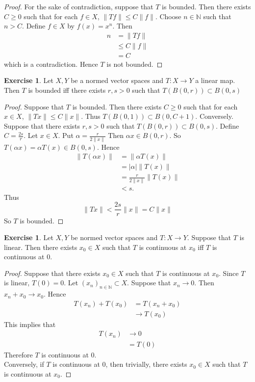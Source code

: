\documentclass[12pt]{amsart}
\theoremstyle{definition}
\newtheorem{ex}[definition]{Exercise}
\newcommand{\al}{\alpha}
\newcommand{\N}{\mathbb{N}}
\DeclareMathOperator*{\0}{\mbf{0}}
\DeclareMathOperator*{\1}{\mbf{1}}
\newcommand{\lex}[1]{\label{ex:#1}}
\begin{document}
	\begin{proof}
	For the sake of contradiction, suppose that $T$ is bounded. Then there exists $C \geq 0$ such that for each $f \in X$, $\|Tf\| \leq C \|f\|$. Choose $n \in \N$ such that $n > C$. Define $f \in X$ by $f(x) = x^n$. Then
	\begin{align*}
	n
	&= \|Tf\| \\
	&\leq C \|f\| \\
	&= C
\end{align*}		
	which is a contradiction. Hence $T$ is not bounded.
	\end{proof}
	
	\begin{ex} \lex{42003}
		Let $X,Y$ be a normed vector spaces and $T:X \rightarrow Y$ a linear map. Then $T$ is bounded iff there exists $r,s>0$ such that $T(B(0,r)) \subset B(0,s)$
	\end{ex}
	
	\begin{proof}
		Suppose that $T$ is bounded. Then there exists $C \geq 0$ such that for each $x \in X$, $\|Tx \|\leq C \|x \|$. Thus $T(B(0,1)) \subset B(0,C+1)$. Conversely. Suppose that there exists $r,s >0$ such that $T(B(0,r)) \subset B(0,s)$. Define $C = \frac{2s}{r}$. Let $x \in X$. Put $\al = \frac{r}{2\|x \|}$ Then $\al x \in B(0,r)$. So $T(\al x ) = \al T(x) \in B(0,s)$. Hence 
		\begin{align*}
			\|T(\al x) \|
			&= \|\al T(x) \|\\
			&= \vert \al \vert \|T(x) \|\\
			& = \frac{r}{2 \|x \|}  \|T(x) \|\\
			& < s.
		\end{align*}
		Thus $$\|Tx \|< \frac{2 s}{r} \|x \|= C \|x \|$$ So $T$ is bounded. 
	\end{proof}
	
	\begin{ex} \lex{42003.1}
	Let $X, Y$ be normed vector spaces and $T:X \rightarrow Y$. Suppose that $T$ is linear. Then there exists $x_0 \in X$ such that $T$ is continuous at $x_0$ iff $T$ is continuous at 0.
	\end{ex}
	
	\begin{proof}
	Suppose that there exists $x_0 \in X$ such that $T$ is continuous at $x_0$. Since $T$ is linear, $T(0) = 0$. Let $(x_n)_{n \in \N} \subset X$. Suppose that $x_n \rightarrow 0$. Then $x_n + x_0 \rightarrow x_0$. Hence 
	\begin{align*}
	T(x_n) + T(x_0)
	&= T(x_n + x_0) \\
	& \rightarrow T(x_0)
	\end{align*}	  
	This implies that 
	\begin{align*}
	T(x_n) 
	&\rightarrow 0 \\
	& = T(0)
	\end{align*}	 
	Therefore $T$ is continuous at $0$. \\
	Conversely, if $T$ is continuous at $0$, then trivially, there exists $x_0 \in X$ such that $T$ is continuous at $x_0$.
	\end{proof}
	
\end{document}
